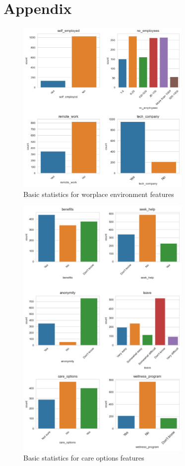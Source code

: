 \documentclass[conference]{IEEEtran}
\begin{document}
\section{Appendix}
\begin{figure}[h]
    \includegraphics[width=0.75\textwidth]{images/workplace-environment.png}
    \centering
    \caption{Basic statistics for worplace environment features}
\end{figure}
\begin{figure}
    \includegraphics[width=0.75\textwidth]{images/care-options.png}
    \centering
    \caption{Basic statistics for care options features}
\end{figure}
\end{document}
